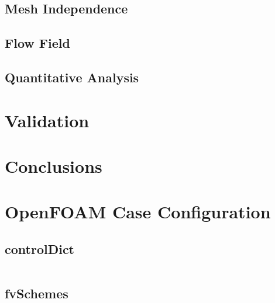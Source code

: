 \documentclass[11pt,a4paper]{article}
\begin{document}
\subsection{Mesh Independence}

\subsection{Flow Field}

\subsection{Quantitative Analysis}

\section{Validation}

\section{Conclusions}

\appendix
\section{OpenFOAM Case Configuration}

\subsection{controlDict}
\begin{lstlisting}[style=openfoam]
%% AUTO-FILLED %%
\end{lstlisting}

\subsection{fvSchemes}
\begin{lstlisting}[style=openfoam]
%% AUTO-FILLED %%
\end{lstlisting}
\end{document}
